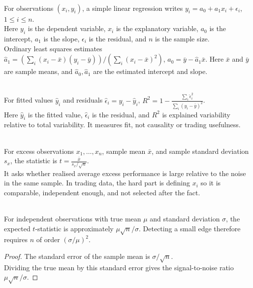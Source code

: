 \begin{model} \\
For observations $(x_i,y_i)$, a simple linear regression writes $y_i=a_0+a_1x_i+\epsilon_i$, $1\leq i\leq n$.\\
Here $y_i$ is the dependent variable, $x_i$ is the explanatory variable, $a_0$ is the intercept, $a_1$ is the slope, $\epsilon_i$ is the residual, and $n$ is the sample size.\\
Ordinary least squares estimates $\hat{a}_1= \left( \sum\limits_i(x_i-\bar{x})(y_i-\bar{y}) \right) / \left( \sum\limits_i(x_i-\bar{x})^2 \right)$, $\hat{a}_0=\bar{y}-\hat{a}_1\bar{x}$. Here $\bar{x}$ and $\bar{y}$ are sample means, and $\hat{a}_0,\hat{a}_1$ are the estimated intercept and slope.
\end{model}

\begin{definition} \\
For fitted values $\hat{y}_i$ and residuals $\hat{\epsilon}_i=y_i-\hat{y}_i$, $R^2=1-\frac{\sum\limits_i\hat{\epsilon}_i^2}{\sum\limits_i(y_i-\bar{y})^2}$.\\
Here $\hat{y}_i$ is the fitted value, $\hat{\epsilon}_i$ is the residual, and $R^2$ is explained variability relative to total variability. It measures fit, not causality or trading usefulness.
\end{definition}

\begin{model} \\
For excess observations $x_1,\ldots,x_n$, sample mean $\bar{x}$, and sample standard deviation $s_x$, the statistic is $t=\frac{\bar{x}}{s_x/\sqrt{n}}$.\\
It asks whether realised average excess performance is large relative to the noise in the same sample. In trading data, the hard part is defining $x_i$ so it is comparable, independent enough, and not selected after the fact.
\end{model}

\begin{proposition} \\
For independent observations with true mean $\mu$ and standard deviation $\sigma$, the expected $t$-statistic is approximately $\mu\sqrt{n}/\sigma$. Detecting a small edge therefore requires $n$ of order $(\sigma/\mu)^2$.
\begin{proof}
The standard error of the sample mean is $\sigma/\sqrt{n}$.\\
Dividing the true mean by this standard error gives the signal-to-noise ratio $\mu\sqrt{n}/\sigma$.
\end{proof}
\end{proposition}

